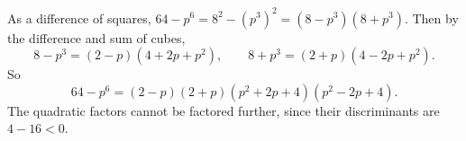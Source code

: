 As a difference of squares, $64-p^6=8^2-\left(p^3\right)^2=\left(8-p^3\right)\left(8+p^3\right)$. Then by the difference and sum of cubes,
\[8-p^3=(2-p)\left(4+2p+p^2\right),\qquad8+p^3=(2+p)\left(4-2p+p^2\right).\]
So
\[64-p^6=\boxed{(2-p)(2+p)\left(p^2+2p+4\right)\left(p^2-2p+4\right)}.\]
The quadratic factors cannot be factored further, since their discriminants are $4-16<0$.
